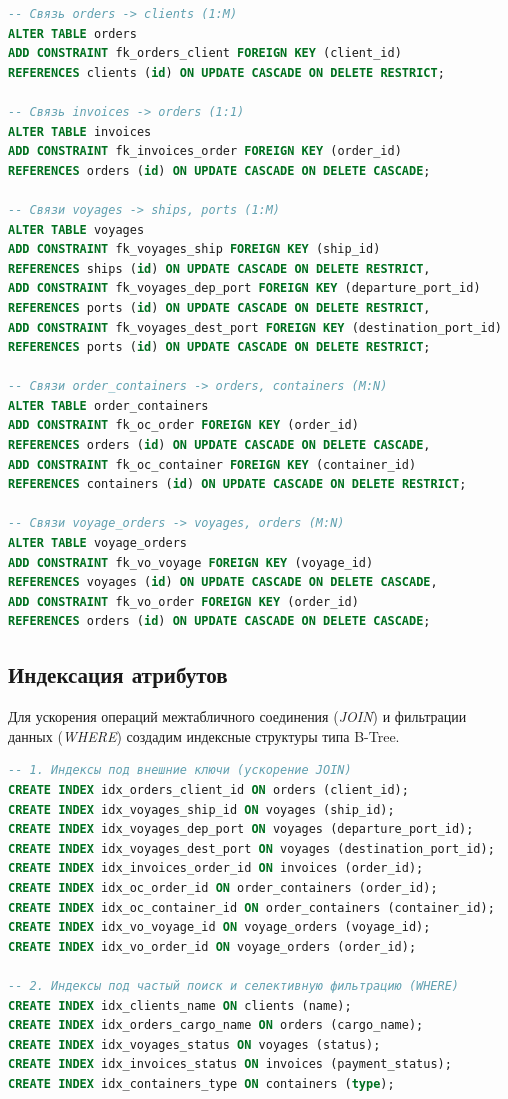 \documentclass[a4paper,14pt]{article}
\begin{document}
\begin{lstlisting}[language=SQL]
-- Связь orders -> clients (1:M)
ALTER TABLE orders
ADD CONSTRAINT fk_orders_client FOREIGN KEY (client_id)
REFERENCES clients (id) ON UPDATE CASCADE ON DELETE RESTRICT;

-- Связь invoices -> orders (1:1)
ALTER TABLE invoices
ADD CONSTRAINT fk_invoices_order FOREIGN KEY (order_id)
REFERENCES orders (id) ON UPDATE CASCADE ON DELETE CASCADE;

-- Связи voyages -> ships, ports (1:M)
ALTER TABLE voyages
ADD CONSTRAINT fk_voyages_ship FOREIGN KEY (ship_id)
REFERENCES ships (id) ON UPDATE CASCADE ON DELETE RESTRICT,
ADD CONSTRAINT fk_voyages_dep_port FOREIGN KEY (departure_port_id)
REFERENCES ports (id) ON UPDATE CASCADE ON DELETE RESTRICT,
ADD CONSTRAINT fk_voyages_dest_port FOREIGN KEY (destination_port_id)
REFERENCES ports (id) ON UPDATE CASCADE ON DELETE RESTRICT;

-- Связи order_containers -> orders, containers (M:N)
ALTER TABLE order_containers
ADD CONSTRAINT fk_oc_order FOREIGN KEY (order_id)
REFERENCES orders (id) ON UPDATE CASCADE ON DELETE CASCADE,
ADD CONSTRAINT fk_oc_container FOREIGN KEY (container_id)
REFERENCES containers (id) ON UPDATE CASCADE ON DELETE RESTRICT;

-- Связи voyage_orders -> voyages, orders (M:N)
ALTER TABLE voyage_orders
ADD CONSTRAINT fk_vo_voyage FOREIGN KEY (voyage_id)
REFERENCES voyages (id) ON UPDATE CASCADE ON DELETE CASCADE,
ADD CONSTRAINT fk_vo_order FOREIGN KEY (order_id)
REFERENCES orders (id) ON UPDATE CASCADE ON DELETE CASCADE;
\end{lstlisting}

\subsection{Индексация атрибутов}
Для ускорения операций межтабличного соединения (\textit{JOIN}) и фильтрации данных (\textit{WHERE}) создадим индексные структуры типа B-Tree.

\begin{lstlisting}[language=SQL]
-- 1. Индексы под внешние ключи (ускорение JOIN)
CREATE INDEX idx_orders_client_id ON orders (client_id);
CREATE INDEX idx_voyages_ship_id ON voyages (ship_id);
CREATE INDEX idx_voyages_dep_port ON voyages (departure_port_id);
CREATE INDEX idx_voyages_dest_port ON voyages (destination_port_id);
CREATE INDEX idx_invoices_order_id ON invoices (order_id);
CREATE INDEX idx_oc_order_id ON order_containers (order_id);
CREATE INDEX idx_oc_container_id ON order_containers (container_id);
CREATE INDEX idx_vo_voyage_id ON voyage_orders (voyage_id);
CREATE INDEX idx_vo_order_id ON voyage_orders (order_id);

-- 2. Индексы под частый поиск и селективную фильтрацию (WHERE)
CREATE INDEX idx_clients_name ON clients (name);
CREATE INDEX idx_orders_cargo_name ON orders (cargo_name);
CREATE INDEX idx_voyages_status ON voyages (status);
CREATE INDEX idx_invoices_status ON invoices (payment_status);
CREATE INDEX idx_containers_type ON containers (type);
\end{lstlisting}
\end{document}
